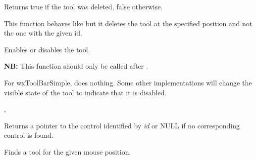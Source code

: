 Returns true if the tool was deleted, false otherwise.



\label{wxtoolbardeletetoolbypos}


This function behaves like  but it
deletes the tool at the specified position and not the one with the given id.

\label{wxtoolbarenabletool}


Enables or disables the tool.




{\bf NB:} This function should only be called after 
.


For wxToolBarSimple, does nothing. Some other implementations
will change the visible state of the tool to indicate that it is disabled.


,\rtfsp
{}

\label{wxtoolbarfindcontrol}


Returns a pointer to the control identified by {\it id} or
NULL if no corresponding control is found.

\label{wxtoolbarfindtoolforposition}


Finds a tool for the given mouse position.



